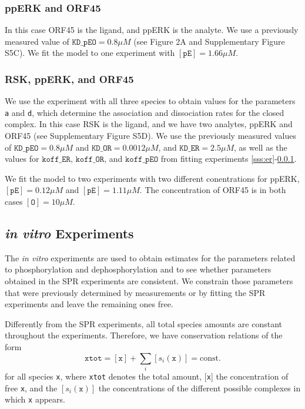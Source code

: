\documentclass[12pt]{article}
\begin{document}
	
	\subsubsection{ppERK and ORF45}
	
	\label{sss:eo} In this case ORF45 is the ligand, and ppERK is the
	analyte. We use a previously measured value of $\texttt{KD\_pEO}=0.8\mu M$
	(see Figure 2A and Supplementary Figure S5C). We fit the model to one experiment with $[\texttt{pE}]=1.66\mu M$.
	
	
	\subsubsection{RSK, ppERK, and ORF45}
	
	We use the experiment with all three species to obtain values for
	the parameters \texttt{a} and \texttt{d}, which determine the association
	and dissociation rates for the closed complex. In this case RSK is
	the ligand, and we have two analytes, ppERK and ORF45 (see Supplementary Figure S5D). We use the previously measured values of $\texttt{KD\_pEO}=0.8\mu M$ and $\texttt{KD\_OR}=0.0012\mu M$, and $\texttt{KD\_ER}=2.5\mu M$, as well as the values for $\texttt{koff\_ER}$, $\texttt{koff\_OR}$, and $\texttt{koff\_pEO}$ from fitting experiments \ref{sss:er}-\ref{sss:eo}.
	
	We fit the model to two experiments with two different conentrations
	for ppERK, $[\texttt{pE}]=0.12\mu M$ and $[\texttt{pE}]=1.11\mu M$.
	The concentration of ORF45 is in both cases $[\texttt{O}]=10\mu M$.
	
	\subsection{\textit{in vitro} Experiments}
	
	The \textit{in vitro} experiments are used to obtain estimates for
	the parameters related to phosphorylation and dephosphorylation and
	to see whether parameters obtained in the SPR experiments are consistent.
	We constrain those parameters that were previously determined by measurements
	or by fitting the SPR experiments and leave the remaining ones free.
	
	Differently from the SPR experiments, all total species amounts are
	constant throughout the experiments. Therefore, we have conservation
	relations of the form 
	\begin{equation}
		\texttt{xtot}=[\texttt{x}]+\sum_{i}[s_{i}(\texttt{x})]=\text{const.}
	\end{equation}
	for all species \texttt{x}, where \texttt{xtot} denotes the total
	amount, {[}\texttt{x}{]} the concentration of free \texttt{x}, and
	the $[s_{i}(\texttt{x})]$ the concentrations of the different possible
	complexes in which \texttt{x} appears.
	
\end{document}
